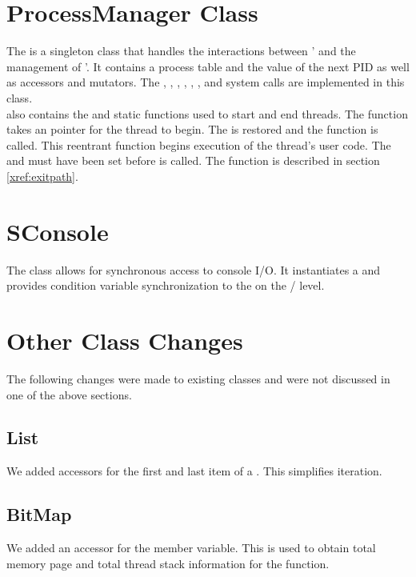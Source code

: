   \section{ProcessManager Class}
    The  is a singleton class that handles the interactions between
    ' and the management of '. It contains a process table
    and the value of the next PID as well as accessors and mutators. The
    , , , ,
    , , and  system calls are implemented in this
    class.\\

     also contains the  and 
    static functions used to start and end threads. The  function
    takes an  pointer for the thread to begin. The  is
    restored and the  function is called. This reentrant function
    begins execution of the thread's user code. The  and  must have
    been set before  is called. The  function is
    described in section \ref{xref:exitpath}.

  \section{SConsole}
  \label{xref:sconsole}
    The  class allows for synchronous access to console I/O. It
    instantiates a  and provides condition variable synchronization to the
     on the / level.

  \section{Other Class Changes}
    The following changes were made to existing classes and were not discussed in one of
    the above sections.

    \subsection{List}
      We added accessors for the first and last item of a . This simplifies
      iteration.
    \subsection{BitMap}
      We added an accessor for the  member variable. This is used to obtain
      total memory page and total thread stack information for the
       function.


